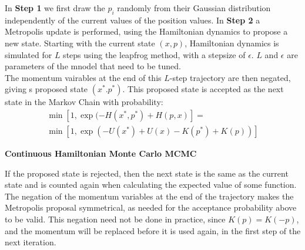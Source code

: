 \documentclass[twoside]{article}
\begin{document}
In \textbf{Step 1} we first draw the $p_{i}$ randomly from their Gaussian distribution independently of the current values of the position values. 
In \textbf{Step 2} a Metropolis update is performed, using the Hamiltonian dynamics to propose a new state. Starting with the current state $(x,p)$, Hamiltonian dynamics is simulated for $L$ steps using the leapfrog method, with a stepsize of $\epsilon$. $L$ and $\epsilon$ are parameters of the mnodel that need to be tuned.\\
The momentum vairables at the end of this $L$-step trajectory are then negated, giving s proposed state $(x^{*}. p^{*})$. This proposed state is accepted as the next state in the Markov Chain with probability: \begin{multline}
\min[1, \exp(-H(x^{*}, p^{*}) + H(p,x)] =\\
\min[1, \exp(-U(x^{*}) + U(x) - K(p^{*}) + K(p))]
\end{multline} 
\begin{algorithm}
	\label{alg:simpHMC}
	\caption{\textbf{Continuous Hamiltonian Monte Carlo MCMC}}
	\begin{algorithmic}[1]
		\EndFor
		  
		\Else
		 
		\EndIf
		\EndFor
		 
		  
		 
		\EndProcedure
	\end{algorithmic} 
\end{algorithm}
If the proposed state is rejected, then the next state is the same as the current state and is counted again when calculating the expected value of some function. 
The negation of the momentum variables at the end of the trajectory makes the Metropolis proposal symmetrical, as needed for the acceptance probability above to be valid. This negation need not be done in practice, since $K(p) = K(-p)$, and the momentum will be replaced before it is used again, in the first step of the next iteration.
\end{document}
